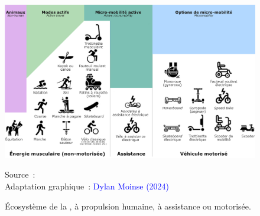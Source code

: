 \begin{refsegment}
    \begin{figure}[h!]\vspace*{4pt}
        \caption{Écosystème de la , à propulsion humaine, à assistance ou motorisée.}
        \label{fig-chap1:ecosysteme-micromobilite}
        \centerline{\includegraphics[width=1\columnwidth]{src/Figures/Chap-1/FR_Ecosysteme_micromobilite.pdf}}
        \vspace{5pt}
        \begin{flushright}\scriptsize{
        Source~: \textcolor{blue}{\textcite[155]{cook_more_2022}}
        \\
        Adaptation graphique~: \textcolor{blue}{Dylan Moinse (2024)}
        }\end{flushright}
    \end{figure}


\end{refsegment}
